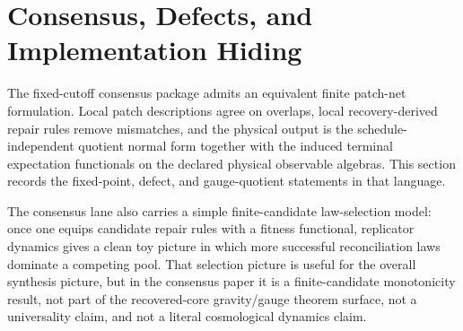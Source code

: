 \section{Consensus, Defects, and Implementation Hiding}

The fixed-cutoff consensus package admits an equivalent finite patch-net formulation. Local patch descriptions agree on
overlaps, local recovery-derived repair rules remove mismatches, and the physical output is the
schedule-independent quotient normal form together with the induced terminal expectation
functionals on the declared physical observable algebras. This section records the fixed-point,
defect, and gauge-quotient statements in that language.

The consensus lane also carries a simple finite-candidate law-selection model: once one equips
candidate repair rules with a fitness functional, replicator dynamics gives a clean toy picture in
which more successful reconciliation laws dominate a competing pool. That selection picture is
useful for the overall synthesis picture, but in the consensus paper it is a finite-candidate
monotonicity result, not part of the recovered-core gravity/gauge theorem surface, not a
universality claim, and not a literal cosmological dynamics claim.

